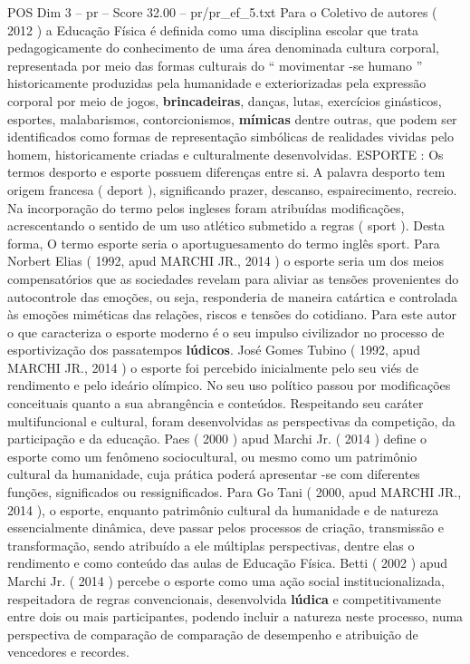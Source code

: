 \begin{textsample}{POS Dim 3 – pr – Score 32.00 – pr/pr\_ef\_5.txt}
Para o Coletivo de autores ( 2012 ) a Educação Física é definida como uma disciplina escolar que trata pedagogicamente do conhecimento de uma área denominada cultura corporal, representada por meio das formas culturais do “ movimentar -se humano ” historicamente produzidas pela humanidade e exteriorizadas pela expressão corporal por meio de jogos, \textbf{brincadeiras}, danças, lutas, exercícios ginásticos, esportes, malabarismos, contorcionismos, \textbf{mímicas} dentre outras, que podem ser identificados como formas de representação simbólicas de realidades vividas pelo homem, historicamente criadas e culturalmente desenvolvidas.
ESPORTE : Os termos desporto e esporte possuem diferenças entre si.
A palavra desporto tem origem francesa ( deport ), significando prazer, descanso, espairecimento, recreio.
Na incorporação do termo pelos ingleses foram atribuídas modificações, acrescentando o sentido de um uso atlético submetido a regras ( sport ).
Desta forma, O termo esporte seria o aportuguesamento do termo inglês sport.
Para Norbert Elias ( 1992, apud MARCHI JR., 2014 ) o esporte seria um dos meios compensatórios que as sociedades revelam para aliviar as tensões provenientes do autocontrole das emoções, ou seja, responderia de maneira catártica e controlada às emoções miméticas das relações, riscos e tensões do cotidiano.
Para este autor o que caracteriza o esporte moderno é o seu impulso civilizador no processo de esportivização dos passatempos \textbf{lúdicos}.
José Gomes Tubino ( 1992, apud MARCHI JR., 2014 ) o esporte foi percebido inicialmente pelo seu viés de rendimento e pelo ideário olímpico.
No seu uso político passou por modificações conceituais quanto a sua abrangência e conteúdos.
Respeitando seu caráter multifuncional e cultural, foram desenvolvidas as perspectivas da competição, da participação e da educação.
Paes ( 2000 ) apud Marchi Jr. ( 2014 ) define o esporte como um fenômeno sociocultural, ou mesmo como um patrimônio cultural da humanidade, cuja prática poderá apresentar -se com diferentes funções, significados ou ressignificados.
Para Go Tani ( 2000, apud MARCHI JR., 2014 ), o esporte, enquanto patrimônio cultural da humanidade e de natureza essencialmente dinâmica, deve passar pelos processos de criação, transmissão e transformação, sendo atribuído a ele múltiplas perspectivas, dentre elas o rendimento e como conteúdo das aulas de Educação Física.
Betti ( 2002 ) apud Marchi Jr. ( 2014 ) percebe o esporte como uma ação social institucionalizada, respeitadora de regras convencionais, desenvolvida \textbf{lúdica} e competitivamente entre dois ou mais participantes, podendo incluir a natureza neste processo, numa perspectiva de comparação de comparação de desempenho e atribuição de vencedores e recordes.

\end{textsample}
